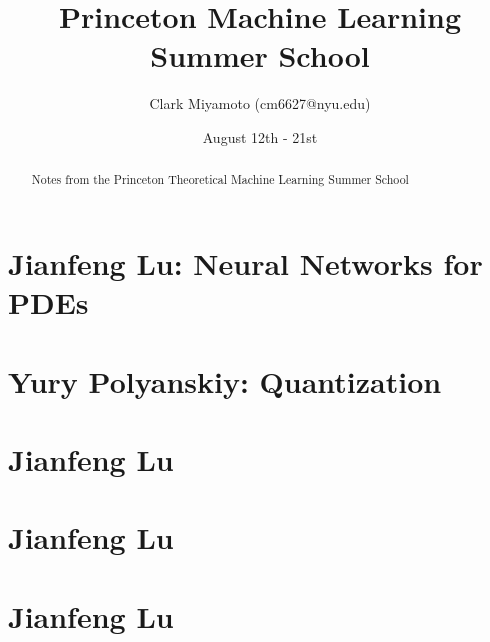 \documentclass[12pt,fleqn]{article}
\title{Princeton Machine Learning Summer School}
\author{Clark Miyamoto (cm6627@nyu.edu)}
\date{August 12th - 21st}
\numberwithin{equation}{section} %
\begin{document}
\maketitle


\begin{abstract}
	Notes from the Princeton Theoretical Machine Learning Summer School
\end{abstract}

\part{Jianfeng Lu: Neural Networks for PDEs}

\newpage

\part{Yury Polyanskiy: Quantization}

\newpage

\part{Jianfeng Lu}
\newpage

\part{Jianfeng Lu}
\newpage

\part{Jianfeng Lu}
\newpage
\end{document}
